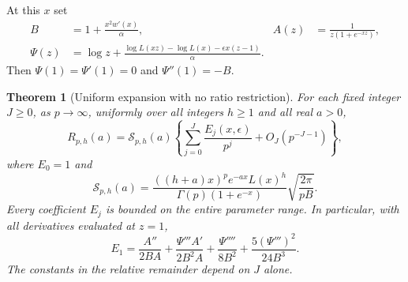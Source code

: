 \documentclass[11pt,a4paper]{article}
\numberwithin{equation}{section}
\theoremstyle{plain}
\newtheorem{theorem}{Theorem}[section]
\theoremstyle{definition}
\theoremstyle{remark}
\begin{document}
At this $x$ set
\begin{align}
 B&=1+\frac{x^2w'(x)}{\alpha},
 &A(z)&=\frac1{z(1+e^{-xz})},\label{us:eq:BA}\\
 \Psi(z)&=\log z+
  \frac{\log L(xz)-\log L(x)-\epsilon x(z-1)}\alpha.
 \label{us:eq:phase}
\end{align}
Then $\Psi(1)=\Psi'(1)=0$ and $\Psi''(1)=-B$.

\begin{theorem}[Uniform expansion with no ratio restriction]
\label{us:thm:uniform}
For each fixed integer $J\ge0$, as $p\to\infty$, uniformly over
all integers $h\ge1$ and all real $a>0$,
\begin{equation}\label{us:eq:uniform}
 R_{p,h}(a)=\mathcal S_{p,h}(a)
 \left\{\sum_{j=0}^J\frac{E_j(x,\epsilon)}{p^j}
       +O_J(p^{-J-1})\right\},
\end{equation}
where $E_0=1$ and
\begin{equation}\label{us:eq:prefactor}
 \mathcal S_{p,h}(a)=
 \frac{((h+a)x)^p e^{-ax}L(x)^h}
      {\Gamma(p)(1+e^{-x})}
 \sqrt{\frac{2\pi}{pB}}.
\end{equation}
Every coefficient $E_j$ is bounded on the entire parameter range.
In particular, with all derivatives evaluated at $z=1$,
\begin{equation}\label{us:eq:E1}
 E_1=\frac{A''}{2BA}
      +\frac{\Psi'''A'}{2B^2A}
      +\frac{\Psi''''}{8B^2}
      +\frac{5(\Psi''')^2}{24B^3}.
\end{equation}
The constants in the relative remainder depend on $J$ alone.
\end{theorem}
\end{document}
